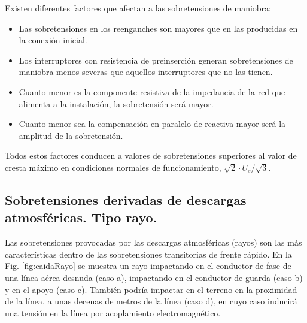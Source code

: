             Existen diferentes factores que afectan a las sobretensiones de maniobra:
            \begin{itemize}
                \item Las sobretensiones en los reenganches son mayores que en las producidas en la conexión inicial.
                \item Los interruptores con resistencia de preinserción generan sobretensiones de maniobra menos severas que aquellos interruptores que no las tienen.
                \item Cuanto menor es la componente resistiva de la impedancia de la red que alimenta a la instalación, la sobretensión será mayor.
                \item Cuanto menor sea la compensación en paralelo de reactiva mayor será la amplitud de la sobretensión.
            \end{itemize} 

            Todos estos factores conducen a valores de sobretensiones superiores al valor de cresta máximo en condiciones normales de funcionamiento, $\sqrt{2}\cdot U_\textit{s}/\sqrt{3}$.

        \subsection{Sobretensiones derivadas de descargas atmosféricas. Tipo rayo.}
            Las sobretensiones provocadas por las descargas atmosféricas (rayos) son las más características dentro de las sobretensiones transitorias de frente rápido. En la Fig. \ref{fig:caidaRayo} se muestra un rayo impactando en el conductor de fase de una línea aérea desnuda (caso a), impactando en el conductor de guarda (caso b) y en el apoyo (caso c). También podría impactar en el terreno en la proximidad de la línea, a unas decenas de metros de la línea (caso d), en cuyo caso inducirá una tensión en la línea por acoplamiento electromagnético.

